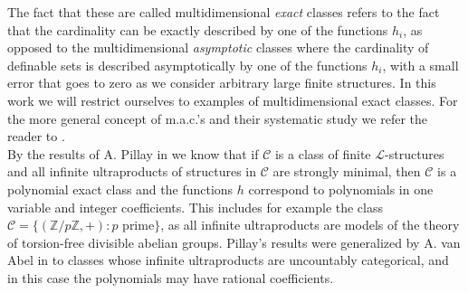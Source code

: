 \documentclass[10pt,a4paper]{amsart}
\theoremstyle{definition}
\newcommand{\Le}{\mathcal{L}}
\begin{document}
The fact that these are called multidimensional \emph{exact} classes refers to the fact that the cardinality can be exactly described by one of the functions $h_i$, as opposed to the multidimensional \emph{asymptotic} classes where the cardinality of definable sets is described asymptotically by one of the functions $h_i$, with a small error that goes to zero as we consider arbitrary large finite structures. In this work we will restrict ourselves to examples of multidimensional exact classes. For the more general concept of m.a.c.'s and their systematic study we refer the reader to \cite{AMSW}.\\

By the results of A. Pillay in \cite{Pillay-stronglyminimalpsf} we know that if $\mathcal{C}$ is a class of finite $\Le$-structures and all infinite ultraproducts of structures in $\mathcal{C}$ are strongly minimal, then $\mathcal{C}$ is a polynomial exact class and the functions $h$ correspond to polynomials in one variable and integer coefficients. This includes for example the class $\mathcal{C}=\{(\mathbb{Z}/p\mathbb{Z},+):\text{$p$ prime}\}$, as all infinite ultraproducts are models of the theory of torsion-free divisible abelian groups. Pillay's results were generalized by A. van Abel in \cite{vanAbel-counting} to classes whose infinite ultraproducts are uncountably categorical, and in this case the polynomials may have rational coefficients. \\
\end{document}
